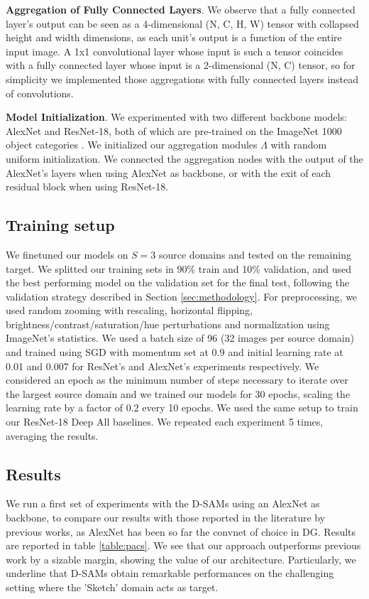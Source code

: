     \textbf{Aggregation of Fully Connected Layers}. We observe that a fully connected layer's output can be seen as a 4-dimensional (N, C, H, W) tensor with collapsed height and width dimensions, as each unit's output is a function of the entire input image. A 1x1 convolutional layer whose input is such a tensor coincides with a fully connected layer whose input is a 2-dimensional (N, C) tensor, so for simplicity we implemented those aggregations with fully connected layers instead of convolutions.
    
    \textbf{Model Initialization}. We experimented with two different backbone models: AlexNet and ResNet-18, both of which are pre-trained on the ImageNet 1000 object categories \cite{ILSVRC15}. We initialized our aggregation modules  $\Lambda$ with random uniform initialization. We connected the aggregation nodes with the output of the AlexNet's layers when using AlexNet as backbone, or with the exit of each residual block when using ResNet-18. 
    
    \subsection{Training setup}
    \label{sec:training}
    We finetuned our models on $S=3$ source domains and tested on the remaining target. We splitted our training sets in 90\% train and 10\% validation, and used the best performing model on the validation set for the final test, following the validation strategy described in Section \ref{sec:methodology}. For preprocessing, we used random zooming with rescaling, horizontal flipping, brightness/contrast/saturation/hue perturbations and normalization using ImageNet's statistics. We used a batch size of 96 (32 images per source domain) and trained using SGD with momentum set at 0.9 and initial learning rate at 0.01 and 0.007 for ResNet's and AlexNet's experiments respectively. We considered an epoch as the minimum number of steps necessary to iterate over the largest source domain and we trained our models for 30 epochs, scaling the learning rate by a factor of 0.2 every 10 epochs. We used the same setup to train our ResNet-18 Deep All baselines. We repeated each experiment 5 times, averaging the results.
    
    \subsection{Results}
    \label{sec:results}
    
    We run a first set of experiments with the D-SAMs using an AlexNet as backbone, to compare our results with those reported in the literature by previous works, as AlexNet has been so far the convnet of choice in DG. Results are reported in table \ref{table:pacs}. We see that our approach outperforms previous work by a sizable margin, showing the value of our architecture. Particularly, we underline that D-SAMs obtain remarkable performances on the challenging setting where the 'Sketch' domain acts as target.
    
